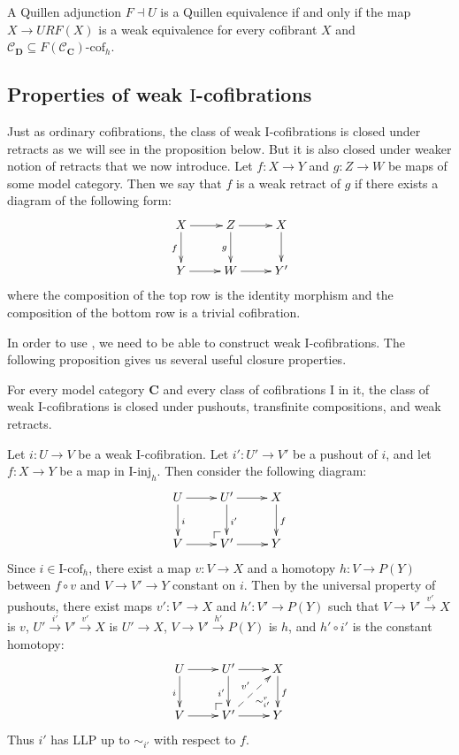 \documentclass{tac}
\makeatletter
\theoremstyle{definition}
\newcommand{\cof}{\mathcal{C}}
\newcommand{\cat}[1]{\mathbf{#1}}
\newcommand{\C}{\cat{C}}
\newcommand{\D}{\cat{D}}
\newcommand{\I}{\mathrm{I}}
\newcommand{\class}[2]{#1\text{-}\mathrm{#2}}
\newcommand{\Iinj}[1][\I]{\class{#1}{inj}}
\newcommand{\Icof}[1][\I]{\class{#1}{cof}}
\newcommand{\po}[1][dr]{\save*!/#1+1.2pc/#1:(1,-1)@^{|-}\restore}
\makeatother
\begin{document}
\begin{cor}
A Quillen adjunction $F \dashv U$ is a Quillen equivalence if and only if the map $X \to URF(X)$ is a weak equivalence for every cofibrant $X$ and $\cof_\D \subseteq \Icof[F(\cof_\C)]_h$.
\end{cor}

\subsection{Properties of weak $\I$-cofibrations}

Just as ordinary cofibrations, the class of weak $\I$-cofibrations is closed under retracts as we will see in the proposition below.
But it is also closed under weaker notion of retracts that we now introduce.
Let $f : X \to Y$ and $g : Z \to W$ be maps of some model category.
Then we say that $f$ is a weak retract of $g$ if there exists a diagram of the following form:
\[ \xymatrix{ X \ar[r] \ar[d]_f & Z \ar[r] \ar[d]_g & X \ar[d] \\
              Y \ar[r]          & W \ar[r]          & Y'
            } \]
where the composition of the top row is the identity morphism and the composition of the bottom row is a trivial cofibration.

In order to use , we need to be able to construct weak $\I$-cofibrations.
The following proposition gives us several useful closure properties.

\begin{prop}
For every model category $\C$ and every class of cofibrations $\I$ in it,
the class of weak $\I$-cofibrations is closed under pushouts, transfinite compositions, and weak retracts.
\end{prop}
\proof
Let $i : U \to V$ be a weak $\I$-cofibration.
Let $i' : U' \to V'$ be a pushout of $i$, and let $f : X \to Y$ be a map in $\Iinj_h$.
Then consider the following diagram:
\[ \xymatrix{ U \ar[r] \ar[d]^i &     U' \ar[r] \ar[d]^{i'} & X \ar[d]^f \\
              V \ar[r]          & \po V' \ar[r]             & Y
            } \]
Since $i \in \Icof_h$, there exist a map $v : V \to X$ and a homotopy $h : V \to P(Y)$ between $f \circ v$ and $V \to V' \to Y$ constant on $i$.
Then by the universal property of pushouts, there exist maps $v' : V' \to X$ and $h' : V' \to P(Y)$ such that $V \to V' \xrightarrow{v'} X$ is $v$,
$U' \xrightarrow{i'} V' \xrightarrow{v'} X$ is $U' \to X$, $V \to V' \xrightarrow{h'} P(Y)$ is $h$, and $h' \circ i'$ is the constant homotopy:
\[ \xymatrix{ U \ar[r] \ar[d]_i &     U' \ar[r] \ar[d]_{i'} \ar@{}[dr]|(.7){\sim^r_{i'}} & X \ar[d]^f \\
              V \ar[r]          & \po V' \ar[r] \ar@{-->}[ur]^{v'}                       & Y
            } \]
Thus $i'$ has LLP up to $\sim_{i'}$ with respect to $f$.
\end{document}
